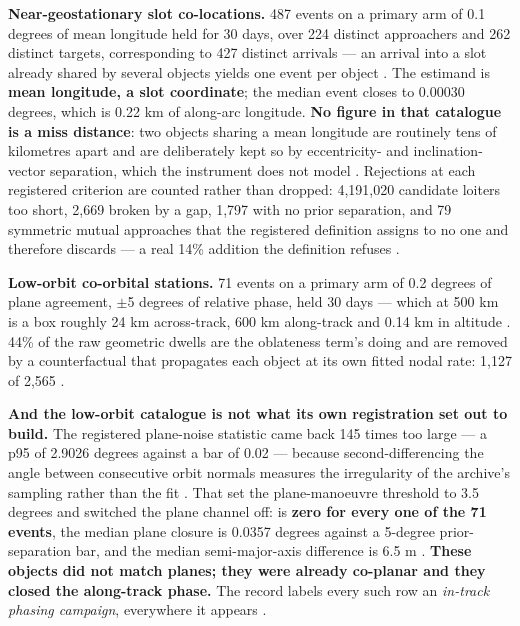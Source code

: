 \documentclass[11pt]{article}
\begin{document}
\textbf{Near-geostationary slot co-locations.} 487 events on a primary arm of 0.1 degrees of mean longitude held for 30 days, over 224 distinct approachers and 262 distinct targets, corresponding to 427 distinct arrivals --- an arrival into a slot already shared by several objects yields one event per object%
. The estimand is \textbf{mean longitude, a slot coordinate}; the median event closes to 0.00030 degrees, which is 0.22 km of along-arc longitude. \textbf{No figure in that catalogue is a miss distance}: two objects sharing a mean longitude are routinely tens of kilometres apart and are deliberately kept so by eccentricity- and inclination-vector separation, which the instrument does not model%
. Rejections at each registered criterion are counted rather than dropped: 4,191,020 candidate loiters too short, 2,669 broken by a gap, 1,797 with no prior separation, and 79 symmetric mutual approaches that the registered definition assigns to no one and therefore discards --- a real 14\% addition the definition refuses%
.

\textbf{Low-orbit co-orbital stations.} 71 events on a primary arm of 0.2 degrees of plane agreement, $\pm$5 degrees of relative phase, held 30 days --- which at 500 km is a box roughly 24 km across-track, 600 km along-track and 0.14 km in altitude%
. 44\% of the raw geometric dwells are the oblateness term's doing and are removed by a counterfactual that propagates each object at its own fitted nodal rate: 1,127 of 2,565%
.

\textbf{And the low-orbit catalogue is not what its own registration set out to build.} The registered plane-noise statistic came back 145 times too large --- a p95 of 2.9026 degrees against a bar of 0.02 --- because second-differencing the angle between consecutive orbit normals measures the irregularity of the archive's sampling rather than the fit%
. That set the plane-manoeuvre threshold to 3.5 degrees and switched the plane channel off:  is \textbf{zero for every one of the 71 events}, the median plane closure is 0.0357 degrees against a 5-degree prior-separation bar, and the median semi-major-axis difference is 6.5 m%
. \textbf{These objects did not match planes; they were already co-planar and they closed the along-track phase.} The record labels every such row an \emph{in-track phasing campaign}, everywhere it appears%
.
\end{document}
